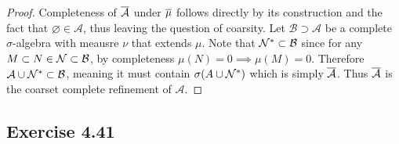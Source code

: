 \documentclass[hw_all.tex]{subfiles}
\begin{document}
\begin{proof}
    Completeness of $\overline{\mathcal{A}}$ under $\overline{\mu}$ follows directly by its construction and the fact that $\varnothing \in \mathcal{A}$, thus leaving the question of coarsity. Let $\mathcal{B} \supset \mathcal{A}$ be a complete $\sigma$-algebra with meausre $\nu$ that extends $\mu$. Note that $\mathcal{N}^* \subset \mathcal{B}$ since for any $M \subset N \in \mathcal{N} \subset \mathcal{B}$, by completeness $\mu(N) = 0 \implies \mu(M) = 0$. Therefore $\mathcal{A} \cup \mathcal{N}^* \subset \mathcal{B}$, meaning it must contain $\sigma(A \cup \mathcal{N}^*)$ which is simply $\overline{\mathcal{A}}$. Thus $\overline{\mathcal{A}}$ is the coarset complete refinement of $\mathcal{A}$.
\end{proof}

\subsection{Exercise 4.41}
\end{document}

